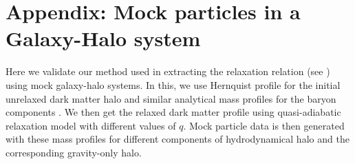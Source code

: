 \section{Appendix: Mock particles in a Galaxy-Halo system}
\label{appen:Mock-ch:simbase}
Here we validate our method used in extracting the relaxation relation (see ) using mock galaxy-halo systems.
In this, we use Hernquist profile for the initial unrelaxed dark matter halo and similar analytical mass profiles for the baryon components \citep[see appendix of][]{2021MNRAS.507..632P}. We then get the relaxed dark matter profile using quasi-adiabatic relaxation model with different values of $q$. Mock particle data is then generated with these mass profiles for different components of hydrodynamical halo and the corresponding gravity-only halo.

